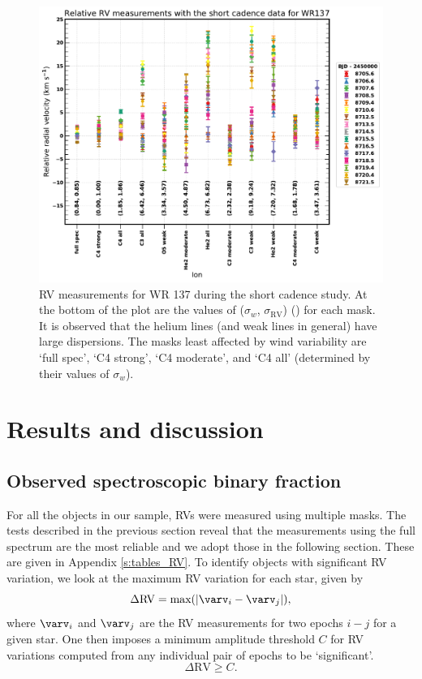 \begin{figure}
    \centering
    \includegraphics[width=\hsize]{chapters/WC/image/RV_SC_ions.pdf}
    \caption{RV measurements for WR 137 during the short cadence study. At the bottom of the plot are the values of ($\sigma_w$, $\sigma_\textrm{RV}$) (\kms{}) for each mask. It is observed that the helium lines (and weak lines in general) have large dispersions. The masks least affected by wind variability are `full spec', `C4 strong', `C4 moderate', and `C4 all' (determined by their values of $\sigma_w$).} 
    \label{fig:ions}
\end{figure}
\section{Results and discussion}\label{sect:results}
\subsection{Observed spectroscopic binary fraction}
For all the objects in our sample, RVs were measured using multiple masks. The tests described in the previous section reveal that the measurements using the full spectrum are the most reliable and we adopt those in the following section. These are given in Appendix \ref{s:tables_RV}. To identify objects with significant RV variation, we look at the maximum RV variation for each star, given by 
\begin{equation}\label{eq:del_RV}
\Delta \textrm{RV} = \textrm{max}(|\varv_i - \varv_j|),
\end{equation}
where $\varv_i$ and $\varv_j$ are the RV measurements for two epochs $i-j$ for a given star. One then imposes a minimum amplitude threshold $C$ for RV variations computed from any individual pair of epochs to be `significant'. 
\begin{equation}\label{eq:signif_crit}
\Delta \textrm{RV} \ge C.
\end{equation}

